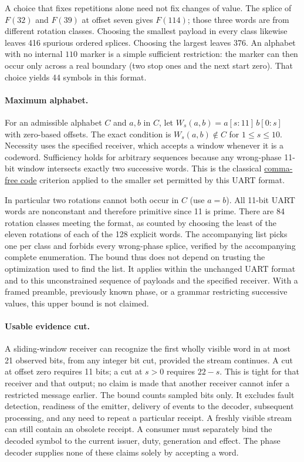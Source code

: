 \documentclass{article}
\begin{document}
A choice that fixes repetitions alone need not fix changes of value. The
splice of \(F(32)\) and \(F(39)\) at offset seven gives \(F(114)\); those three
words are from different rotation classes. Choosing the smallest payload in
every class likewise leaves 416 spurious ordered splices. Choosing the
largest leaves 376. An alphabet with no internal \(110\) marker is a
simple sufficient restriction: the marker can then occur only across a
real boundary (two stop ones and the next start zero). That choice yields
44 symbols in this format.

\paragraph{Maximum alphabet.}
For an admissible alphabet \(C\) and \(a,b\) in \(C\), let
\(W_s(a,b)=a[s:11]\,b[0:s]\) with zero-based offsets. The exact condition
is \(W_s(a,b)\notin C\) for \(1\leq s\leq 10\). Necessity uses the specified
receiver, which accepts a window whenever it is a codeword. Sufficiency
holds for arbitrary sequences because any wrong-phase 11-bit window
intersects exactly two successive words. This is the classical
\href{https://doi.org/10.4153/CJM-1958-023-9}{comma-free code} criterion
applied to the smaller set permitted by this UART format.

In particular two rotations cannot both occur in \(C\) (use \(a=b\)).
All 11-bit UART words are nonconstant and therefore primitive since 11
is prime. There are 84 rotation classes meeting the format, as counted by
choosing the least of the eleven rotations of each of the 128 explicit
words. The accompanying list picks one per class and forbids every
wrong-phase splice, verified by the accompanying complete enumeration.
The bound thus does not depend on trusting the optimization used to find
the list. It applies within the unchanged UART format and to this
unconstrained sequence of payloads and the specified receiver. With a
framed preamble, previously known phase, or a grammar restricting
successive values, this upper bound is not claimed.

\paragraph{Usable evidence cut.}
A sliding-window receiver can recognize the first wholly visible word
in at most 21 observed bits, from any integer bit cut, provided the
stream continues. A cut at offset zero requires 11 bits; a cut at
\(s>0\) requires \(22-s\). This is tight for that receiver and that
output; no claim is made that another receiver cannot infer a restricted
message earlier. The bound counts sampled bits only. It excludes fault
detection, readiness of the emitter, delivery of events to the decoder,
subsequent processing, and any need to repeat a particular receipt.
A freshly visible stream can still contain an obsolete receipt. A
consumer must separately bind the decoded symbol to the current issuer,
duty, generation and effect. The phase decoder supplies none of these
claims solely by accepting a word.
\end{document}
